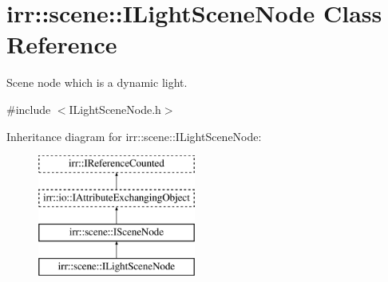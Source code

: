 \hypertarget{classirr_1_1scene_1_1ILightSceneNode}{}\section{irr\+:\+:scene\+:\+:I\+Light\+Scene\+Node Class Reference}
\label{classirr_1_1scene_1_1ILightSceneNode}


Scene node which is a dynamic light.  




{\ttfamily \#include $<$I\+Light\+Scene\+Node.\+h$>$}

Inheritance diagram for irr\+:\+:scene\+:\+:I\+Light\+Scene\+Node\+:\begin{figure}[H]
\begin{center}
\leavevmode
\includegraphics[height=4.000000cm]{classirr_1_1scene_1_1ILightSceneNode}
\end{center}
\end{figure}
